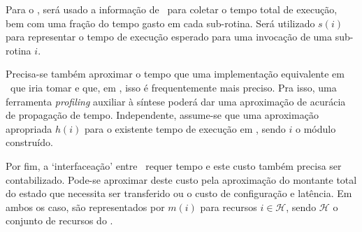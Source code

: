       Para o \software, será usado a informação de \profile\ para coletar o tempo total de execução, bem com uma fração do tempo gasto em cada sub-rotina.
      Será utilizado $ s(i) $ para representar o tempo de execução esperado para uma invocação de uma sub-rotina $ i $.

      Precisa-se também aproximar o tempo que uma implementação equivalente em \hardware\ que iria tomar e que, em \hardware, isso é frequentemente mais preciso.
      Pra isso, uma ferramenta \textit{profiling} auxiliar à síntese poderá dar uma aproximação de acurácia de propagação de tempo.
      Independente, assume-se que uma aproximação apropriada $ h(i) $ para o existente tempo de execução em \hardware, sendo $ i $ o módulo construído.

      Por fim, a `interfaceação' entre \hs\ requer tempo e este custo também precisa ser contabilizado.
      Pode-se aproximar deste custo pela aproximação do montante total do estado que necessita ser transferido ou o custo de configuração e latência.
      Em ambos os caso, são representados por $ m(i) $ para recursos $ i \in \mathcal{H} $, sendo $\mathcal{H}$ o conjunto de recursos do \hardware.

